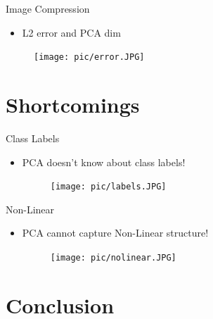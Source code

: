 \documentclass[serif, aspectratio=169]{beamer}
\begin{document}
\begin{frame}{Image Compression}
       \begin{itemize}
           \item L2 error and PCA dim
       \end{itemize}
        \begin{figure}[htpb]
            \begin{center}
                \texttt{[image: pic/error.JPG]}
            \end{center}
        \end{figure}
\end{frame}

\section{Shortcomings}

\begin{frame}{Class Labels}
    \begin{itemize}
        \item PCA doesn’t know about class labels!
        \begin{figure}[htpb]
            \begin{center}
                \texttt{[image: pic/labels.JPG]}
            \end{center}
        \end{figure}
    \end{itemize}
\end{frame}


\begin{frame}{Non-Linear}
    \begin{itemize}
        \item PCA cannot capture Non-Linear structure!
        \begin{figure}[htpb]
            \begin{center}
                \texttt{[image: pic/nolinear.JPG]}
            \end{center}
        \end{figure}
    \end{itemize}
\end{frame}

\section{Conclusion}
\end{document}

